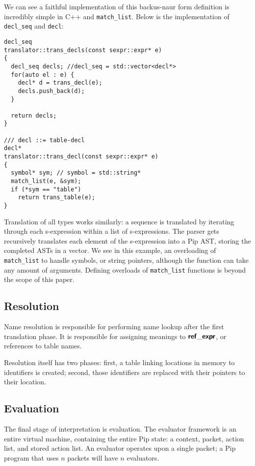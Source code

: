 We can see a faithful implementation of this backus-naur form definition is incredibly simple in C++ and \texttt{match\_list}. Below is the implementation of \texttt{decl\_seq} and \texttt{decl}:
\begin{mdframed}
\begin{verbatim}
decl_seq
translator::trans_decls(const sexpr::expr* e)
{
  decl_seq decls; //decl_seq = std::vector<decl*>
  for(auto el : e) {
    decl* d = trans_decl(e);
    decls.push_back(d);
  }
   
  return decls;
}
  
/// decl ::= table-decl
decl*
translator::trans_decl(const sexpr::expr* e)
{
  symbol* sym; // symbol = std::string*
  match_list(e, &sym);
  if (*sym == "table")
    return trans_table(e);
}
\end{verbatim}
\end{mdframed}
Translation of all types works similarly: a sequence is translated by iterating through each s-expression within a list of s-expressions. The parser gets recursively translates each element of the s-expression into a Pip AST, storing the completed ASTs in a vector. We see in this example, an overloading of \texttt{match\_list} to handle symbols, or string pointers, although the function can take any amount of arguments. Defining overloads of \texttt{match\_list} functions is beyond the scope of this paper.
           
\subsection{Resolution}
Name resolution is responsible for performing name lookup after the first translation phase. It is responsible for assigning meanings to $\bm{\mathsf{{ref\_expr}}}$, or references to table names.

Resolution itself has two phases: first, a table linking locations in memory to identifiers is created; second, those identifiers are replaced with their pointers to their location.
\subsection{Evaluation}
The final stage of interpretation is evaluation. The evaluator framework is an entire virtual machine, containing the entire Pip state: a context, packet, action list, and stored action list. An evaluator operates upon a single packet; a Pip program that uses $n$ packets will have $n$ evaluators.

